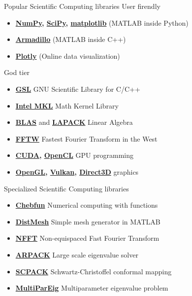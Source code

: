 \documentclass[xcolor={dvipsnames}]{beamer}
\begin{document}
\begin{frame}{Popular Scientific Computing libraries}{}
User firendly
\begin{itemize}
	\item \textbf{\href{http://www.numpy.org/}{NumPy}, \href{https://www.scipy.org/}{SciPy}, \href{http://matplotlib.org/}{matplotlib}} (MATLAB inside Python)
	\item \href{http://arma.sourceforge.net/}{\textbf{Armadillo}} (MATLAB inside C++)
	\item \href{https://plot.ly/}{\textbf{Plotly}} (Online data visualization)
\end{itemize}

\pause
\bigskip
God tier
\begin{itemize}
	\item \href{https://www.gnu.org/software/gsl/}{\textbf{GSL}} GNU Scientific Library for C/C++
	\item \href{https://software.intel.com/en-us/intel-mkl}{\textbf{Intel MKL}} Math Kernel Library
	\item \href{http://www.netlib.org/blas/}{\textbf{BLAS}} and \href{http://www.netlib.org/lapack/}{\textbf{LAPACK}} Linear Algebra
	\item \href{http://www.fftw.org/}{\textbf{FFTW}} Fastest Fourier Transform in the West
	\item \textbf{\href{http://www.nvidia.com/object/cuda_home_new.html}{CUDA}, \href{https://www.khronos.org/opencl/}{OpenCL}} GPU programming
	\item \textbf{\href{https://www.opengl.org/}{OpenGL}, \href{https://www.khronos.org/vulkan/}{Vulkan}, \href{https://msdn.microsoft.com/en-us/library/windows/desktop/hh309466(v=vs.85).aspx}{Direct3D}} graphics
\end{itemize}
\end{frame}


\begin{frame}{Specialized Scientific Computing libraries}{}

\begin{itemize}
\item \href{http://www.chebfun.org/}{\textbf{Chebfun}} Numerical computing with functions
\item \href{http://persson.berkeley.edu/distmesh/}{\textbf{DistMesh}} Simple mesh generator in MATLAB
\item \href{https://www-user.tu-chemnitz.de/~potts/nfft/index.php}{\textbf{NFFT}} Non-equispaced Fast Fourier Transform
\item \href{http://www.caam.rice.edu/software/ARPACK/}{\textbf{ARPACK}} Large scale eigenvalue solver
\item \href{http://www.math.udel.edu/~driscoll/SC/}{\textbf{SCPACK}} Schwartz-Christoffel conformal mapping
\item \href{https://www.mathworks.com/matlabcentral/fileexchange/47844-multipareig}{\textbf{MultiParEig}} Multiparameter eigenvalue problem
\end{itemize}
\end{frame}
\end{document}
